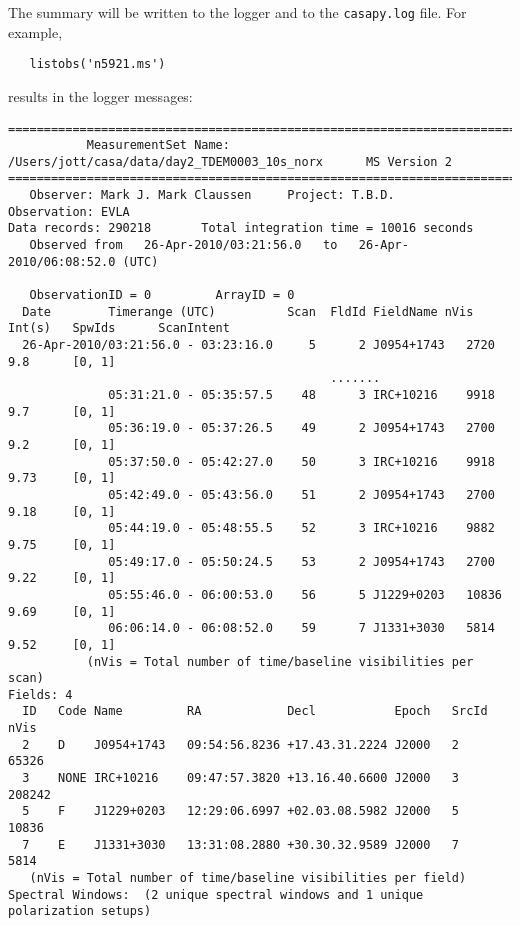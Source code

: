 The summary will be written to the logger and to the {\tt casapy.log}
file.  For example,
\small
\begin{verbatim}
   listobs('n5921.ms')
\end{verbatim}
\normalsize
results in the logger messages:
\small
\begin{verbatim}
================================================================================
           MeasurementSet Name:  /Users/jott/casa/data/day2_TDEM0003_10s_norx      MS Version 2
================================================================================
   Observer: Mark J. Mark Claussen     Project: T.B.D.  
Observation: EVLA
Data records: 290218       Total integration time = 10016 seconds
   Observed from   26-Apr-2010/03:21:56.0   to   26-Apr-2010/06:08:52.0 (UTC)

   ObservationID = 0         ArrayID = 0
  Date        Timerange (UTC)          Scan  FldId FieldName nVis   Int(s)   SpwIds      ScanIntent
  26-Apr-2010/03:21:56.0 - 03:23:16.0     5      2 J0954+1743   2720   9.8      [0, 1]                      
                                             .......   
              05:31:21.0 - 05:35:57.5    48      3 IRC+10216    9918   9.7      [0, 1]                      
              05:36:19.0 - 05:37:26.5    49      2 J0954+1743   2700   9.2      [0, 1]                      
              05:37:50.0 - 05:42:27.0    50      3 IRC+10216    9918   9.73     [0, 1]                      
              05:42:49.0 - 05:43:56.0    51      2 J0954+1743   2700   9.18     [0, 1]                      
              05:44:19.0 - 05:48:55.5    52      3 IRC+10216    9882   9.75     [0, 1]                      
              05:49:17.0 - 05:50:24.5    53      2 J0954+1743   2700   9.22     [0, 1]                      
              05:55:46.0 - 06:00:53.0    56      5 J1229+0203   10836  9.69     [0, 1]                      
              06:06:14.0 - 06:08:52.0    59      7 J1331+3030   5814   9.52     [0, 1]                      
           (nVis = Total number of time/baseline visibilities per scan) 
Fields: 4
  ID   Code Name         RA            Decl           Epoch   SrcId nVis   
  2    D    J0954+1743   09:54:56.8236 +17.43.31.2224 J2000   2     65326  
  3    NONE IRC+10216    09:47:57.3820 +13.16.40.6600 J2000   3     208242 
  5    F    J1229+0203   12:29:06.6997 +02.03.08.5982 J2000   5     10836  
  7    E    J1331+3030   13:31:08.2880 +30.30.32.9589 J2000   7     5814   
   (nVis = Total number of time/baseline visibilities per field) 
Spectral Windows:  (2 unique spectral windows and 1 unique polarization setups)

\end{verbatim}
